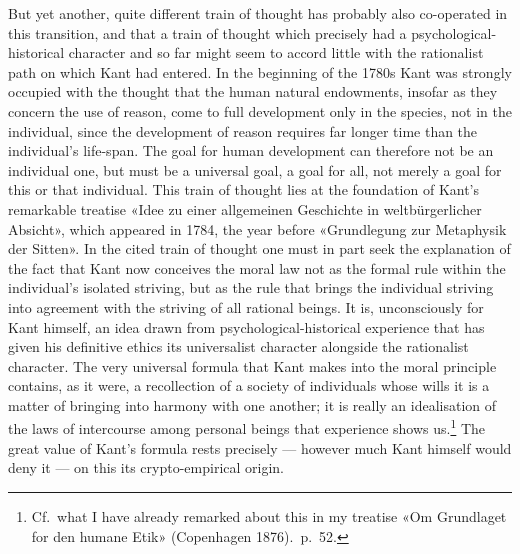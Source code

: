\documentclass[12pt,a4paper]{article}
\newcommand{\opage}[1]{\marginnote{\footnotesize\textit{[#1]}}}
\begin{document}
But yet another, quite different train of thought has probably also
co-operated in this transition, and that a train of thought which precisely
had a psychological-historical character and so far might seem to accord
little with the rationalist path on which Kant had entered. In the beginning
of the 1780s Kant was strongly occupied with the thought that the human
natural endowments, insofar as they concern the use of reason, come to full
development only in the species, not in the individual, since the development
of reason requires far longer time than the individual's life-span. The goal
for human development can therefore not be an individual one, but must be a
universal goal, a goal for all, not merely a goal for this or that
individual. This train of thought lies at the foundation of Kant's
remarkable treatise «Idee zu einer allgemeinen Geschichte in
weltbürgerlicher Absicht», which appeared in 1784, the year before
«Grundlegung zur Metaphysik der Sitten». In the cited train of thought one
must in part seek the explanation of the fact that Kant now conceives the
moral law not as the formal rule within the individual's isolated striving,
but as the rule that brings the individual striving into agreement with the
striving of all rational beings. It is, unconsciously for Kant himself, an
idea drawn from psychological-historical experience that has given his
definitive ethics its universalist character alongside the rationalist
character. The very universal formula that Kant makes into the moral
principle contains, as it were, a recollection of a society of individuals
whose wills it \opage{45}is a matter of bringing into harmony with one another; it is
really an idealisation of the laws of intercourse among personal beings that
experience shows us.\footnote{Cf.\ what I have already remarked about this in
my treatise «Om Grundlaget for den humane Etik» (Copenhagen 1876).\ p.\ 52.}
The great value of Kant's formula rests precisely --- however much Kant
himself would deny it --- on this its crypto-empirical origin.
\end{document}
